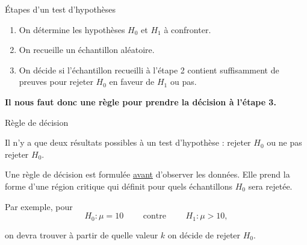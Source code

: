 \documentclass{BeamerTemplate}
\begin{document}
\begin{frame}[t]{Étapes d'un test d'hypothèses}

\begin{enumerate}
    \item On détermine les hypothèses $H_0$ et $H_1$ à confronter.
    \item On recueille un échantillon aléatoire.
    \item On décide si l'échantillon recueilli à l'étape 2 contient
    suffisamment de preuves pour rejeter $H_0$ en faveur de $H_1$ ou pas.
\end{enumerate}

\bigskip

{\bf Il nous faut donc une règle pour prendre la décision à l'étape 3.}

\end{frame}

\begin{frame}[t]{Règle de décision}

Il n'y a que deux résultats possibles à un test d'hypothèse : \alert{rejeter} $H_0$ ou
\alert{ne pas rejeter} $H_0$.
\bigskip

Une règle de décision est formulée \underline{avant} d'observer les données. Elle  prend la forme d'une \alert{région critique} qui définit pour quels échantillons $H_0$ sera rejetée.

\bigskip

Par exemple, pour
$$H_0 : \mu = 10 \qquad \mbox{ contre } \qquad  H_1 : \mu > 10,$$

on devra trouver à partir de quelle valeur $k$ on décide de rejeter $H_0$.

\bigskip

\end{frame}
\end{document}
